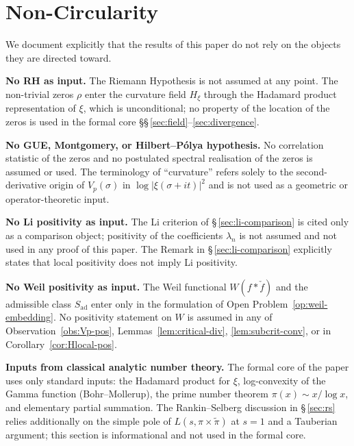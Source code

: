 \documentclass[11pt]{article}
\newcommand{\Hxi}{H_{\xi}}
\newcommand{\Sad}{S_{\mathrm{ad}}}
\begin{document}
\section*{Non-Circularity}
\label{sec:nocirc}

We document explicitly that the results of this paper do not
rely on the objects they are directed toward.

\textbf{No RH as input.}
The Riemann Hypothesis is not assumed at any point.
The non-trivial zeros $\rho$ enter the curvature field $\Hxi$
through the Hadamard product representation of $\xi$, which
is unconditional; no property of the location of the zeros is
used in the formal core
\S\S\,\ref{sec:field}--\ref{sec:divergence}.

\textbf{No GUE, Montgomery, or Hilbert--P\'olya hypothesis.}
No correlation statistic of the zeros and no postulated
spectral realisation of the zeros is assumed or used.
The terminology of ``curvature'' refers solely to the
second-derivative origin of $V_p(\sigma)$ in
$\log\lvert\xi(\sigma+it)\rvert^{2}$ and is not used as a
geometric or operator-theoretic input.

\textbf{No Li positivity as input.}
The Li criterion of \S\,\ref{sec:li-comparison} is cited only
as a comparison object; positivity of the coefficients
$\lambda_n$ is not assumed and not used in any proof of this
paper.
The Remark in \S\,\ref{sec:li-comparison} explicitly states
that local positivity does not imply Li positivity.

\textbf{No Weil positivity as input.}
The Weil functional $W(f*\check f)$ and the admissible class
$\Sad$ enter only in the formulation of
Open Problem~\ref{op:weil-embedding}.
No positivity statement on $W$ is assumed in any of
Observation~\ref{obs:Vp-pos}, Lemmas~\ref{lem:critical-div},
\ref{lem:subcrit-conv}, or in
Corollary~\ref{cor:Hlocal-pos}.

\textbf{Inputs from classical analytic number theory.}
The formal core of the paper uses only standard inputs:
the Hadamard product for $\xi$, log-convexity of the Gamma
function (Bohr--Mollerup), the prime number theorem
$\pi(x)\sim x/\log x$, and elementary partial summation.
The Rankin--Selberg discussion in \S\,\ref{sec:rs} relies
additionally on the simple pole of
$L(s,\pi\times\widetilde{\pi})$ at $s=1$ and a Tauberian
argument; this section is informational and not used in the
formal core.
\end{document}
